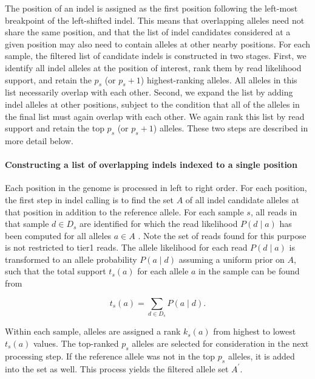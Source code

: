 \documentclass{article}
\begin{document}
The position of an indel is assigned as the first position following the left-most breakpoint of the left-shifted indel. This means that overlapping alleles need not share the same position, and that the list of indel candidates considered at a given position may also need to contain alleles at other nearby positions. For each sample, the filtered list of candidate indels is constructed in two stages. First, we identify all indel alleles at the position of interest, rank them by read likelihood support, and retain the $p_s$ (or $p_s+1$) highest-ranking alleles. All alleles in this list necessarily overlap with each other. Second, we expand the list by adding indel alleles at other positions, subject to the condition that all of the alleles in the final list must again overlap with each other. We again rank this list by read support and retain the top $p_s$ (or $p_s+1$) alleles. These two steps are described in more detail below.

\paragraph{Constructing a list of overlapping indels indexed to a single position}

Each position in the genome is processed in left to right order. For each position, the first step in indel calling is to find the set $A$ of all indel candidate alleles at that position in addition to the reference allele. For each sample $s$, all reads in that sample $d \in D_s$ are identified for which the read likelihood $P(d \mid a)$ has been computed for all alleles $a \in A$ . Note the set of reads found for this purpose is not restricted to tier1 reads. The allele likelihood for each read $P(d \mid a)$ is transformed to an allele probability $P(a \mid d)$ assuming a uniform prior on $A$, such that the total support $t_s(a)$ for each allele $a$ in the sample can be found from

\begin{equation}
\label{eq:perSampleAlleleSupport}
t_s(a) = \sum_{d \in D_s}{P(a \mid d)}.
\end{equation}

Within each sample, alleles are assigned a rank $k_s(a)$ from highest to lowest $t_s(a)$ values. The top-ranked $p_s$ alleles are selected for consideration in the next processing step. If the reference allele was not in the top $p_s$ alleles, it is added into the set as well. This process yields the filtered allele set $A^{\prime}$.

\end{document}
